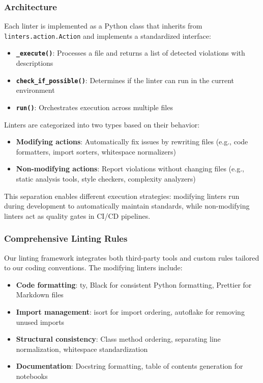 \subsubsection{Architecture}
Each linter is implemented as a Python class that inherits from
\texttt{linters.action.Action}
and implements a standardized interface:
\begin{itemize}
  \item \textbf{\texttt{\_execute()}}: Processes a file and returns a list
    of detected violations with descriptions

  \item \textbf{\texttt{check\_if\_possible()}}: Determines if the linter
    can run in the current environment

  \item \textbf{\texttt{run()}}: Orchestrates execution across multiple files
\end{itemize}

Linters are categorized into two types based on their behavior:
\begin{itemize}
  \item \textbf{Modifying actions}: Automatically fix issues by rewriting
    files (e.g., code formatters, import sorters, whitespace normalizers)

  \item \textbf{Non-modifying actions}: Report violations without changing
    files (e.g., static analysis tools, style checkers, complexity
    analyzers)
\end{itemize}

This separation enables different execution strategies: modifying linters
run during development to automatically maintain standards, while non-modifying
linters act as quality gates in CI/CD pipelines.

\subsubsection{Comprehensive Linting Rules}

Our linting framework integrates both third-party tools and custom rules
tailored to our coding conventions. The modifying linters include:

\begin{itemize}
  \item \textbf{Code formatting}: ty, Black for consistent Python formatting,
    Prettier for Markdown files

  \item \textbf{Import management}: isort for import ordering, autoflake
    for removing unused imports

  \item \textbf{Structural consistency}: Class method ordering,
    separating line normalization, whitespace standardization

  \item \textbf{Documentation}: Docstring formatting, table of contents
    generation for notebooks
\end{itemize}

